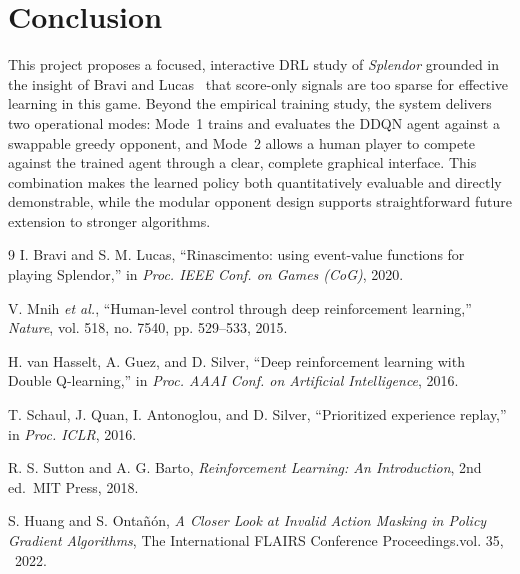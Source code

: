 \documentclass[11pt]{article}
\begin{document}
\section{Conclusion}

This project proposes a focused, interactive DRL study of \textit{Splendor} grounded in the
insight of Bravi and Lucas~\cite{bravi2020} that score-only signals are too sparse for
effective learning in this game. Beyond the empirical training study, the system delivers two
operational modes: Mode~1 trains and evaluates the DDQN agent against a swappable greedy
opponent, and Mode~2 allows a human player to compete against the trained agent through a
clear, complete graphical interface. This combination makes the learned policy both
quantitatively evaluable and directly demonstrable, while the modular opponent design
supports straightforward future extension to stronger algorithms.

\begin{thebibliography}{9}
I. Bravi and S. M. Lucas,
``Rinascimento: using event-value functions for playing Splendor,''
in \textit{Proc. IEEE Conf. on Games (CoG)}, 2020.

V. Mnih \textit{et al.},
``Human-level control through deep reinforcement learning,''
\textit{Nature}, vol. 518, no. 7540, pp. 529--533, 2015.

H. van Hasselt, A. Guez, and D. Silver,
``Deep reinforcement learning with Double Q-learning,''
in \textit{Proc. AAAI Conf. on Artificial Intelligence}, 2016.

T. Schaul, J. Quan, I. Antonoglou, and D. Silver,
``Prioritized experience replay,''
in \textit{Proc. ICLR}, 2016.

R. S. Sutton and A. G. Barto,
\textit{Reinforcement Learning: An Introduction},
2nd ed.\ MIT Press, 2018.

S. Huang and S. Ontañón,
\textit{A Closer Look at Invalid Action Masking in Policy Gradient Algorithms},
The International FLAIRS Conference Proceedings.vol. 35, \ 2022.
\end{thebibliography}
\end{document}
